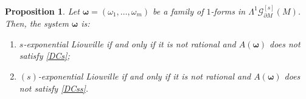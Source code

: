 \documentclass[11pt,reqno]{amsart}
\numberwithin{equation}{section}
\newtheorem{proposition}[theorem]{Proposition}
\begin{document}
	\begin{proposition}\label{liou_DCs}
		Let $\boldsymbol{\omega}=(\omega_1,\dots,\omega_m)$ be a family of $1$-forms in 
		$\mathsf{\Lambda}^1\mathscr{G}^{[s]}_{\partial M}(M)$. Then, the system $\boldsymbol{\omega}$ is:
		\begin{enumerate}
			\item[(i)] $s$-exponential Liouville if and only if it is not rational and 
			$A(\boldsymbol{\omega})$ does not satisfy \eqref{DCs};
			
			\item[(ii)] $(s)$-exponential Liouville if and only if it is not rational and 
			$A(\boldsymbol{\omega})$ does not satisfy \eqref{DCss}.
		\end{enumerate}
	\end{proposition}
\end{document}

